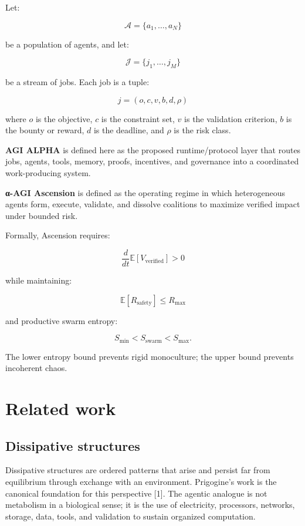 \documentclass[11pt]{article}
\begin{document}
Let:

\[
\mathcal{A}=\{a_1,\ldots,a_N\}
\]

be a population of agents, and let:

\[
\mathcal{J}=\{j_1,\ldots,j_M\}
\]

be a stream of jobs. Each job is a tuple:

\[
j=(o,c,v,b,d,\rho)
\]

where \(o\) is the objective, \(c\) is the constraint set, \(v\) is the
validation criterion, \(b\) is the bounty or reward, \(d\) is the
deadline, and \(\rho\) is the risk class.

\textbf{AGI ALPHA} is defined here as the proposed runtime/protocol
layer that routes jobs, agents, tools, memory, proofs, incentives, and
governance into a coordinated work-producing system.

\textbf{α-AGI Ascension} is defined as the operating regime in which
heterogeneous agents form, execute, validate, and dissolve coalitions to
maximize verified impact under bounded risk.

Formally, Ascension requires:

\[
\frac{d}{dt}\mathbb{E}[V_{\text{verified}}] > 0
\]

while maintaining:

\[
\mathbb{E}[R_{\text{safety}}] \leq R_{\max}
\]

and productive swarm entropy:

\[
S_{\min}<S_{\text{swarm}}<S_{\max}.
\]

The lower entropy bound prevents rigid monoculture; the upper bound
prevents incoherent chaos.

\section{Related work}\label{related-work}

\subsection{Dissipative structures}\label{dissipative-structures}

Dissipative structures are ordered patterns that arise and persist far
from equilibrium through exchange with an environment. Prigogine's work
is the canonical foundation for this perspective {[}1{]}. The agentic
analogue is not metabolism in a biological sense; it is the use of
electricity, processors, networks, storage, data, tools, and validation
to sustain organized computation.
\end{document}
